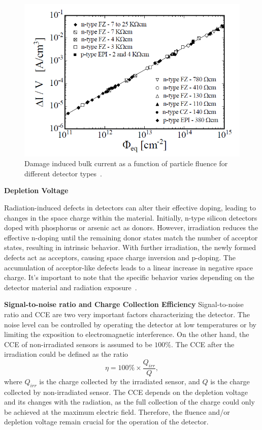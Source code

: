 \begin{figure}[!h]
\centering
\includegraphics[width=0.75\columnwidth]{Chapter2/images/lekage_current_fluence.png}
\caption{Damage induced bulk current as a function of particle fluence
for different detector types~\cite{Moll:1999kv}.}
\label{fig_leakage_theory}
\end{figure}
\textbf{Depletion Voltage}\bigbreak

Radiation-induced defects in detectors can alter their effective doping, leading to changes in the space charge within the material. Initially, n-type silicon detectors doped with phosphorus or arsenic act as donors. However, irradiation reduces the effective n-doping until the remaining donor states match the number of acceptor states, resulting in intrinsic behavior. With further irradiation, the newly formed defects act as acceptors, causing space charge inversion and p-doping. The accumulation of acceptor-like defects leads to a linear increase in negative space charge. It's important to note that the specific behavior varies depending on the detector material and radiation exposure~\cite{Momot:2019lnx, Hartmann:2017gzy}. \bigbreak

\textbf{Signal-to-noise ratio and Charge Collection Efficiency }\bigbreak
Signal-to-noise ratio and CCE are two very important factors characterizing the detector. The noise level can be controlled by operating the detector at low temperatures or by limiting the exposition to electromagnetic interference. On the other hand, the CCE of non-irradiated sensors is assumed to be $100\%$. The CCE after the irradiation could be defined as the ratio
\begin{equation}
    \eta = 100\%\times\frac{Q_{irr}}{Q},
\end{equation}
where $Q_{irr}$ is the charge collected by the irradiated sensor, and $Q$ is the charge collected by non-irradiated sensor. 
The CCE depends on the depletion voltage and its changes with the radiation, as the full collection of the charge could only be achieved at the maximum electric field. Therefore, the fluence and/or depletion voltage remain crucial for the operation of the detector. 

